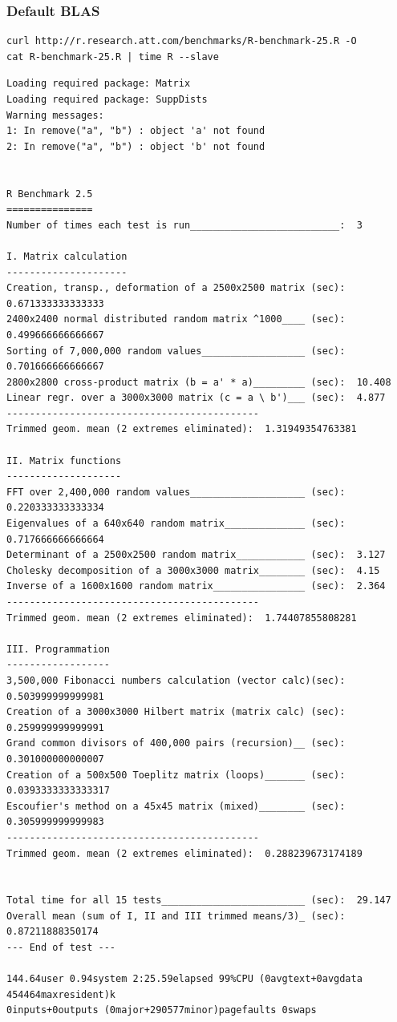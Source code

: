 \documentclass{article}
\begin{document}
\subsubsection*{Default BLAS}
\label{sec:org960ccb6}
\begin{verbatim}
curl http://r.research.att.com/benchmarks/R-benchmark-25.R -O
cat R-benchmark-25.R | time R --slave
\end{verbatim}

\begin{verbatim}
Loading required package: Matrix
Loading required package: SuppDists
Warning messages:
1: In remove("a", "b") : object 'a' not found
2: In remove("a", "b") : object 'b' not found


R Benchmark 2.5
===============
Number of times each test is run__________________________:  3

I. Matrix calculation
---------------------
Creation, transp., deformation of a 2500x2500 matrix (sec):  0.671333333333333
2400x2400 normal distributed random matrix ^1000____ (sec):  0.499666666666667
Sorting of 7,000,000 random values__________________ (sec):  0.701666666666667
2800x2800 cross-product matrix (b = a' * a)_________ (sec):  10.408
Linear regr. over a 3000x3000 matrix (c = a \ b')___ (sec):  4.877
--------------------------------------------
Trimmed geom. mean (2 extremes eliminated):  1.31949354763381

II. Matrix functions
--------------------
FFT over 2,400,000 random values____________________ (sec):  0.220333333333334
Eigenvalues of a 640x640 random matrix______________ (sec):  0.717666666666664
Determinant of a 2500x2500 random matrix____________ (sec):  3.127
Cholesky decomposition of a 3000x3000 matrix________ (sec):  4.15
Inverse of a 1600x1600 random matrix________________ (sec):  2.364
--------------------------------------------
Trimmed geom. mean (2 extremes eliminated):  1.74407855808281

III. Programmation
------------------
3,500,000 Fibonacci numbers calculation (vector calc)(sec):  0.503999999999981
Creation of a 3000x3000 Hilbert matrix (matrix calc) (sec):  0.259999999999991
Grand common divisors of 400,000 pairs (recursion)__ (sec):  0.301000000000007
Creation of a 500x500 Toeplitz matrix (loops)_______ (sec):  0.0393333333333317
Escoufier's method on a 45x45 matrix (mixed)________ (sec):  0.305999999999983
--------------------------------------------
Trimmed geom. mean (2 extremes eliminated):  0.288239673174189


Total time for all 15 tests_________________________ (sec):  29.147
Overall mean (sum of I, II and III trimmed means/3)_ (sec):  0.87211888350174
--- End of test ---

144.64user 0.94system 2:25.59elapsed 99%CPU (0avgtext+0avgdata 454464maxresident)k
0inputs+0outputs (0major+290577minor)pagefaults 0swaps
\end{verbatim}
\end{document}
